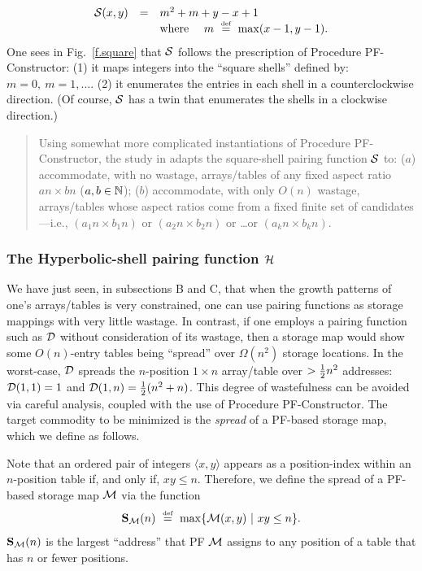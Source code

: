 \begin{equation}
\label{e.square}
\begin{array}{ccl}
\mbox{$\cal S$}(x, y) & = & m^2 + m + y-x+1 \\
 & & \mbox{where } \ \ \  m \ \stackrel{\mbox{{\tiny def}}}{=} \ \max(x-1,y-1).
\end{array}
\end{equation}
One sees in Fig.~\ref{f.square} that $\mbox{$\cal S$}$ follows the prescription of
Procedure PF-Constructor: (1) it maps integers into the ``square
shells'' defined by: $m = 0, \ m = 1, ...$.  (2) it enumerates the
entries in each shell in a counterclockwise direction.  (Of course,
$\mbox{$\cal S$}$ has a twin that enumerates the shells in a clockwise direction.)
\begin{quote}
Using somewhat more complicated instantiations of Procedure
PF-Constructor, the study in \cite{Rosenberg75} adapts the
square-shell pairing function $\mbox{$\cal S$}$ to: ($a$) accommodate, with no
wastage, arrays/tables of any fixed aspect ratio $an \times bn$ ($a,b
\in \mathbb{N}$); ($b$) accommodate, with only $O(n)$ wastage, arrays/tables
whose aspect ratios come from a fixed finite set of candidates---i.e.,
$(a_1 n \times b_1 n)$ or $(a_2 n \times b_2 n)$ or \ldots or $(a_k n
\times b_k n)$.
\end{quote}

\subsubsection{The Hyperbolic-shell pairing function $\mbox{$\cal H$}$}

We have just seen, in subsections B and C, that when the growth
patterns of one's arrays/tables is very constrained, one can use
pairing functions as storage mappings with very little wastage.  In
contrast, if one employs a pairing function such as $\mbox{$\cal D$}$ without
consideration of its wastage, then a storage map would show some
$O(n)$-entry tables being ``spread'' over $\Omega(n^2)$ storage
locations.  In the worst-case, $\mbox{$\cal D$}$ spreads the $n$-position $1 \times
n$ array/table over $> {1 \over 2} n^2$ addresses: $\mbox{$\cal D$}(1,1) = 1$ and
$\mbox{$\cal D$}(1,n) = {1 \over 2} (n^2 + n)$.  This degree of wastefulness can be
avoided via careful analysis, coupled with the use of Procedure
PF-Constructor.  The target commodity to be minimized is the {\it
  spread} of a PF-based storage map, which we define as follows.

Note that an ordered pair of integers $\langle x,y \rangle$ appears as
a position-index within an $n$-position table if, and only if, $xy
\leq n$.  Therefore, we define the spread of a PF-based storage map
$\mbox{$\cal M$}$ via the function
\begin{equation}
\label{e.compact}
{\bf S}_{\cal M}(n) \ \stackrel{\mbox{{\tiny def}}}{=} \ \max\{ \mbox{$\cal M$}(x, y) \ | \ xy \leq n \}.
\end{equation}
${\bf S}_{\cal M}(n)$ is the largest ``address'' that PF $\mbox{$\cal M$}$ assigns
to any position of a table that has $n$ or fewer positions.

